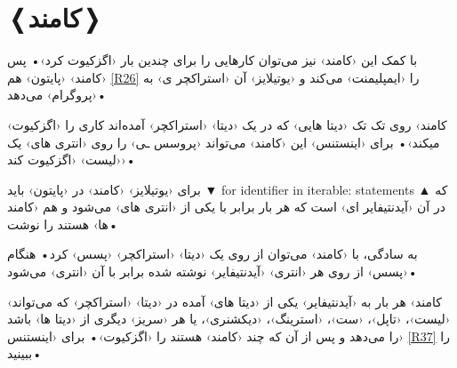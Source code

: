 \documentclass[openany, twocolumn]{book}
\begin{document}
\section{❬کامند❭ \label{R36}}
با کمک این ‹کامند› نیز می‌توان کار‌هایی را برای چندین بار ‹اگزکیوت کرد›• پس ‹کامند›  ‹پایتون› هم \ref{R26} را ‹ایمپلیمنت› می‌کند و ‹یوتیلایز› آن ‹استراکچر ی› به ‹پروگرام› می‌دهد•

‹کامند›  روی تک تک ‹دیتا هایی› که در یک ‹دیتا› ‹استراکچر› آمده‌اند کاری را ‹اگزکیوت میکند›• برای ‹اینستنس› این ‹کامند› می‌تواند ‹پروسس ـی› را روی ‹انتری های› یک ‹لیست› ‹اگزکیوت کند›•

\begin{Usage}
برای ‹یوتیلایز› ‹کامند›  در ‹پایتون› باید 
▼
for identifier in iterable:
	statements
▲
 که در آن  ‹آیدنتیفایر ای› است که هر بار برابر با یکی از ‹انتری های›  می‌شود و  هم ‹کامند ها› هستند را نوشت•

به سادگی، با ‹کامند›  می‌توان از روی یک ‹دیتا› ‹استراکچر› ‹پسس› کرد• هنگام ‹پسس› از روی هر ‹انتری› ‹آیدنتیفایر› نوشته شده برابر با آن ‹انتری› می‌شود•
\end{Usage}

‹کامند›  هر بار به ‹آیدنتیفایر›  یکی از ‹دیتا های› آمده در ‹دیتا› ‹استراکچر›  که می‌تواند ‹لیست›، ‹تاپل›، ‹ست›، ‹استرینگ›، ‹دیکشنری›، یا هر ‹سریز› دیگری از ‹دیتا ها› باشد را می‌دهد و پس از آن  که چند ‹کامند› هستند را ‹اگزکیوت›• برای ‹اینستنس› \ref{R37} را ببینید•
\end{document}
